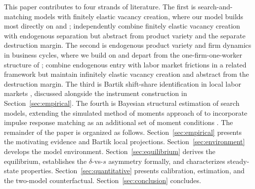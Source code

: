 \documentclass[authoryear, review, 12pt]{elsarticle}
\begin{document}
	This paper contributes to four strands of literature. The first 
	is search-and-matching models with finitely elastic vacancy 
	creation, where our model builds most directly on 
	\citet{coles_2018} and \citet{gabrovski_2025}; \citet{broer_2025} 
	independently combine finitely elastic vacancy creation with 
	endogenous separation but abstract from product variety and the 
	separate destruction margin. The second is endogenous product 
	variety and firm dynamics in business cycles, where we build on 
	\citet{bilbiie_2012} and depart from the one-firm-one-worker 
	structure of \citet{shao_2013}; \citet{colciago_2021} combine 
	endogenous entry with labor market frictions in a related 
	framework but maintain infinitely elastic vacancy creation and 
	abstract from the destruction margin. The third is Bartik 
	shift-share identification in local labor markets 
	\citep{goldsmith_2020, nakamura_2014}, discussed alongside the 
	instrument construction in Section~\ref{sec:empirical}. The 
	fourth is Bayesian structural estimation of search models, 
	extending the simulated method of moments approach of 
	\citet{coles_2018} to incorporate impulse response matching as 
	an additional set of moment conditions \citep{christiano_2016}. 
	The remainder of the paper is organized as follows. 
	Section~\ref{sec:empirical} presents the motivating evidence 
	and Bartik local projections. Section~\ref{sec:environment} 
	develops the model environment. Section~\ref{sec:equilibrium} 
	derives the equilibrium, establishes the $\delta$-vs-$s$ 
	asymmetry formally, and characterizes steady-state properties. 
	Section~\ref{sec:quantitative} presents calibration, estimation, 
	and the two-model counterfactual. 
	Section~\ref{sec:conclusion} concludes.
	
	
\end{document}
